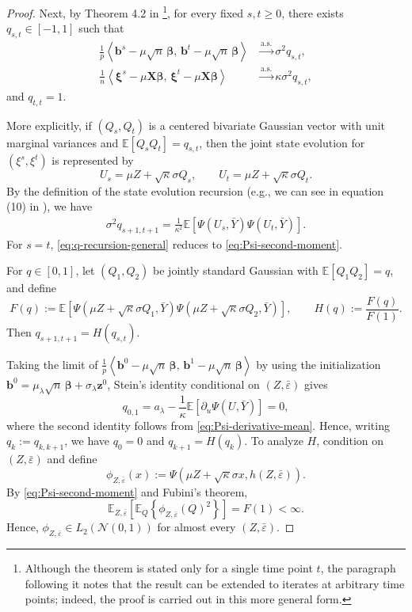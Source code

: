 \documentclass[12pt,reqno]{amsart}
\newcommand{\as}{\overset{\mathrm{a.s.}}{\longrightarrow}}
\begin{document}
{\begin{proof}
Next, by Theorem 4.2 in \citep{feng2022unifying}\footnote{Although the theorem is stated only for a single time point $t$, the paragraph following it notes that the result can be extended to iterates at arbitrary time points; indeed, the proof is carried out in this more general form.
}, for every fixed $s,t\ge0$, there exists $q_{s,t}\in[-1,1]$ such that
\begin{align}
\frac1p\left\langle\bm b^s-\mu\sqrt n\,\bm\beta,\,\bm b^t-\mu\sqrt n\,\bm\beta\right\rangle
&\as
\sigma^2q_{s,t},
\label{eq:joint-se-b}\\
\frac1n
\left\langle
\bm\xi^s-\mu\bm X\bm\beta,\,
\bm\xi^t-\mu\bm X\bm\beta
\right\rangle
&\as
\kappa\sigma^2q_{s,t},
\label{eq:joint-se-xi}
\end{align}
and $q_{t,t}=1$.

More explicitly, if $(Q_s,Q_t)$ is a centered bivariate Gaussian
vector with unit marginal variances and
$\mathbb E[Q_sQ_t]=q_{s,t}$, then the joint state evolution for
$(\xi^s,\xi^t)$ is represented by
\[
U_s=\mu Z+\sqrt{\kappa}\sigma Q_s,
\qquad
U_t=\mu Z+\sqrt{\kappa}\sigma Q_t.
\]
By the definition of the state evolution recursion (e.g., we can see in equation (10) in \citep{feng2022unifying}), we have
\begin{align}
\sigma^2q_{s+1,t+1}
=
\frac{1}{\kappa^2}
\mathbb E[
\Psi(U_s,\bar Y)\Psi(U_t,\bar Y)
].
\label{eq:q-recursion-general}
\end{align}
For $s=t$, \eqref{eq:q-recursion-general} reduces to
\eqref{eq:Psi-second-moment}.

For $q\in[0,1]$, let $(Q_1,Q_2)$ be jointly standard Gaussian with
$\mathbb E[Q_1Q_2]=q$, and define
\[
F(q):=\mathbb E[\Psi(\mu Z+\sqrt{\kappa}\sigma Q_1,\bar Y)
\Psi(\mu Z+\sqrt{\kappa}\sigma Q_2,\bar Y)],\qquad
H(q):=\frac{F(q)}{F(1)}.
\]
Then $q_{s+1,t+1}=H(q_{s,t}).$

Taking the limit of $\frac1p\left\langle\bm b^0-\mu\sqrt n\,\bm\beta,\,\bm b^1-\mu\sqrt n\,\bm\beta\right\rangle$ by using the initialization $\bm b^0
=\mu_\lambda\sqrt n\,\bm\beta
+\sigma_\lambda\bm z^0$, Stein's identity
conditional on $(Z,\bar\varepsilon)$ gives
\[
q_{0,1}=a_\lambda-\frac1\kappa
\mathbb E[\partial_u\Psi(U,\bar Y)]=0,
\]
where the second identity follows from \eqref{eq:Psi-derivative-mean}.
Hence, writing $q_k:=q_{k,k+1}$, we have
$
q_0=0$ and $q_{k+1}=H(q_k).$
To analyze $H$, condition on $(Z,\bar\varepsilon)$ and define
\[
\phi_{Z,\bar\varepsilon}(x)
:=
\Psi(
\mu Z+\sqrt{\kappa}\sigma x,
h(Z,\bar\varepsilon)
).
\]
By \eqref{eq:Psi-second-moment} and Fubini's theorem,
\[
\mathbb E_{Z,\bar\varepsilon}
\left[
\mathbb E_Q
\left\{
\phi_{Z,\bar\varepsilon}(Q)^2
\right\}
\right]
=
F(1)
<
\infty.
\]
Hence,
$\phi_{Z,\bar\varepsilon}\in L_2(\mathcal N(0,1))$
for almost every $(Z,\bar\varepsilon)$.


\end{proof}}
\end{document}
